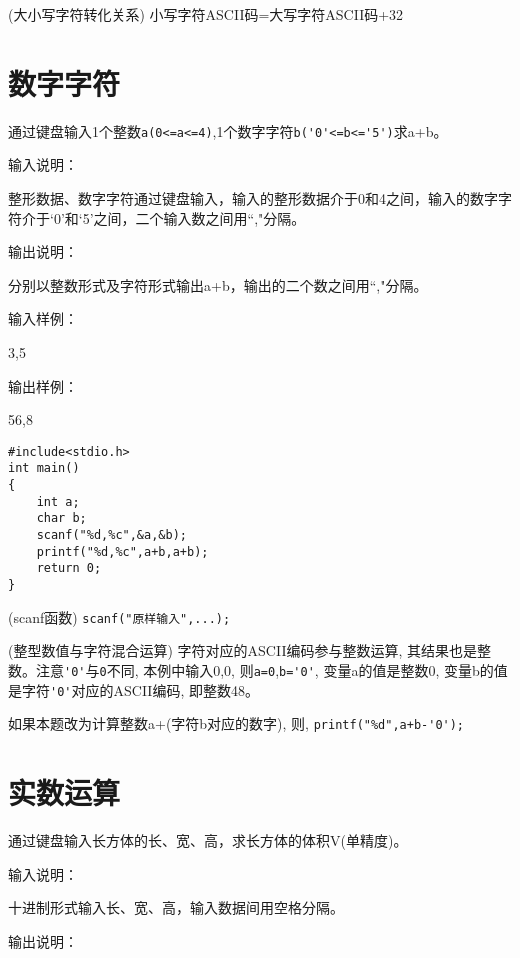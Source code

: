 \begin{note}(大小写字符转化关系)
	小写字符ASCII码=大写字符ASCII码+32
\end{note}

\section{数字字符}
通过键盘输入1个整数\lstinline|a(0<=a<=4)|,1个数字字符\lstinline|b('0'<=b<='5')|求a+b。

输入说明：

整形数据、数字字符通过键盘输入，输入的整形数据介于0和4之间，输入的数字字符介于`0'和`5'之间，二个输入数之间用``,"分隔。

输出说明：

分别以整数形式及字符形式输出a+b，输出的二个数之间用``,"分隔。

输入样例：

3,5

输出样例：

56,8

\newpage

\begin{lstlisting}
#include<stdio.h>    
int main()                   
{  
	int a;
	char b;
	scanf("%d,%c",&a,&b);
	printf("%d,%c",a+b,a+b); 
	return 0;           
}             
\end{lstlisting}

\begin{note}(scanf函数)
	\lstinline|scanf("原样输入",...); |
\end{note}

\begin{note}(整型数值与字符混合运算)
	字符对应的ASCII编码参与整数运算, 其结果也是整数。注意\lstinline|'0'|与\lstinline|0|不同, 本例中输入0,0, 则\lstinline|a=0|,\lstinline|b='0'|, 变量a的值是整数0, 变量b的值是字符\lstinline|'0'|对应的ASCII编码, 即整数48。
	
	如果本题改为计算整数a+(字符b对应的数字), 则, \lstinline|printf("%d",a+b-'0');|
\end{note}

\section{实数运算}
通过键盘输入长方体的长、宽、高，求长方体的体积V(单精度)。

输入说明：

十进制形式输入长、宽、高，输入数据间用空格分隔。

输出说明：


